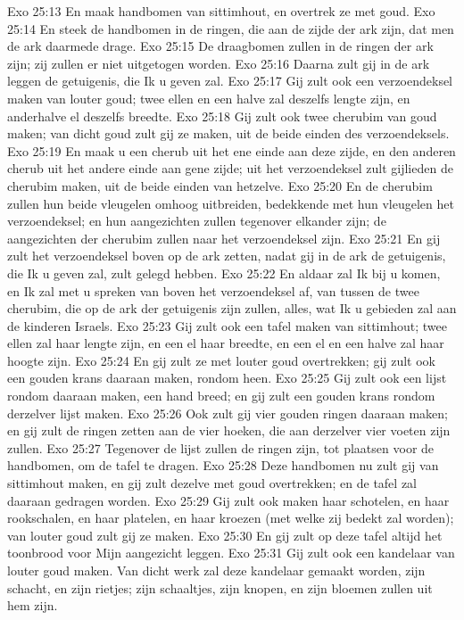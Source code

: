 Exo 25:13  En maak handbomen van sittimhout, en overtrek ze met goud.
Exo 25:14  En steek de handbomen in de ringen, die aan de zijde der ark zijn, dat men de ark daarmede drage.
Exo 25:15  De draagbomen zullen in de ringen der ark zijn; zij zullen er niet uitgetogen worden.
Exo 25:16  Daarna zult gij in de ark leggen de getuigenis, die Ik u geven zal.
Exo 25:17  Gij zult ook een verzoendeksel maken van louter goud; twee ellen en een halve zal deszelfs lengte zijn, en anderhalve el deszelfs breedte.
Exo 25:18  Gij zult ook twee cherubim van goud maken; van dicht goud zult gij ze maken, uit de beide einden des verzoendeksels.
Exo 25:19  En maak u een cherub uit het ene einde aan deze zijde, en den anderen cherub uit het andere einde aan gene zijde; uit het verzoendeksel zult gijlieden de cherubim maken, uit de beide einden van hetzelve.
Exo 25:20  En de cherubim zullen hun beide vleugelen omhoog uitbreiden, bedekkende met hun vleugelen het verzoendeksel; en hun aangezichten zullen tegenover elkander zijn; de aangezichten der cherubim zullen naar het verzoendeksel zijn.
Exo 25:21  En gij zult het verzoendeksel boven op de ark zetten, nadat gij in de ark de getuigenis, die Ik u geven zal, zult gelegd hebben.
Exo 25:22  En aldaar zal Ik bij u komen, en Ik zal met u spreken van boven het verzoendeksel af, van tussen de twee cherubim, die op de ark der getuigenis zijn zullen, alles, wat Ik u gebieden zal aan de kinderen Israels.
Exo 25:23  Gij zult ook een tafel maken van sittimhout; twee ellen zal haar lengte zijn, en een el haar breedte, en een el en een halve zal haar hoogte zijn.
Exo 25:24  En gij zult ze met louter goud overtrekken; gij zult ook een gouden krans daaraan maken, rondom heen.
Exo 25:25  Gij zult ook een lijst rondom daaraan maken, een hand breed; en gij zult een gouden krans rondom derzelver lijst maken.
Exo 25:26  Ook zult gij vier gouden ringen daaraan maken; en gij zult de ringen zetten aan de vier hoeken, die aan derzelver vier voeten zijn zullen.
Exo 25:27  Tegenover de lijst zullen de ringen zijn, tot plaatsen voor de handbomen, om de tafel te dragen.
Exo 25:28  Deze handbomen nu zult gij van sittimhout maken, en gij zult dezelve met goud overtrekken; en de tafel zal daaraan gedragen worden.
Exo 25:29  Gij zult ook maken haar schotelen, en haar rookschalen, en haar platelen, en haar kroezen (met welke zij bedekt zal worden); van louter goud zult gij ze maken.
Exo 25:30  En gij zult op deze tafel altijd het toonbrood voor Mijn aangezicht leggen.
Exo 25:31  Gij zult ook een kandelaar van louter goud maken. Van dicht werk zal deze kandelaar gemaakt worden, zijn schacht, en zijn rietjes; zijn schaaltjes, zijn knopen, en zijn bloemen zullen uit hem zijn.
